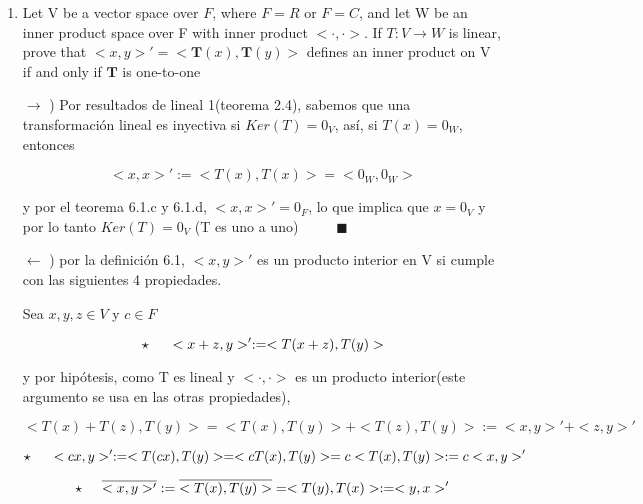 \documentclass[12pt,a4paper]{article}
\begin{document}
\begin{enumerate}
    
    
    
    \item Let V be a vector space over $F$, where $F = R$ or $F = C$, and let W be an inner product space over F with inner product $<\cdot,\cdot>$. If $T:V \rightarrow W$ is linear, prove that $<x,y>' = <\textbf{T}(x), \textbf{T}(y)>$ defines an inner product on V if and only if $\textbf{T}$ is one-to-one
    
    $\rightarrow$ ) Por resultados de lineal 1(teorema 2.4), sabemos que una transformación lineal es inyectiva si $Ker(T) = {0_V} $, así, si $T(x) = 0_W$, entonces
    
    \begin{equation*}
        <x,x>' := <T(x), T(x)> = <0_W,0_W>    
    \end{equation*}
    
    y por el teorema 6.1.c y 6.1.d, $<x,x>' = 0_F $, lo que implica  que $x = 0_V$ y por lo tanto $Ker(T) = {0_V}$ (T es uno a uno) $ \hspace{1cm}\blacksquare$
    
    $\leftarrow$ ) por la definición 6.1, $<x,y>'$  es un producto interior en V si cumple con las siguientes 4 propiedades.
    
    Sea $x,y,z \in V$ y $c \in F$
    
    \begin{equation*}
        \star \hspace{0.5cm} <x+z, y>' := <T(x+z),T(y)>
    \end{equation*}
    
    y por hipótesis, como T es lineal y $<\cdot,\cdot>$ es un producto interior(este argumento se usa en las otras propiedades),
    
    \begin{equation*}
        <T(x) + T(z) , T(y)> = <T(x),T(y)> + <T(z),T(y)> := <x,y>' + <z,y>'
    \end{equation*}
    
    \begin{equation*}
        \star \hspace{0.5cm} <cx,y>' := <T(cx),T(y)> = <cT(x),T(y)> = c<T(x),T(y)> := c<x,y>'
    \end{equation*}
    
    \begin{equation*}
        \star \hspace{0.5cm} \overline{<x,y>'} := \overline{<T(x),T(y)>} = <T(y),T(x)> := <y,x>'
    \end{equation*}
    

\end{enumerate}
\end{document}
